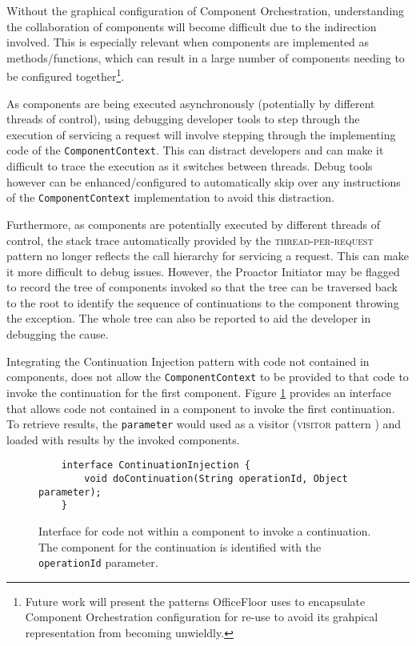 \documentclass[prodmode]{style/acmlarge}
\begin{document}
Without the graphical configuration of Component Orchestration, understanding
the collaboration of components will become difficult due to the indirection
involved.  This is especially relevant when components are implemented as
methods/functions, which can result in a large number of components needing to
be configured together\footnote{Future work will present the patterns
OfficeFloor \cite{officefloor} uses to encapsulate Component Orchestration
configuration for re-use to avoid its grahpical representation from becoming
unwieldly.}.

As components are being executed asynchronously (potentially by different
threads of control), using debugging developer tools to step through the
execution of servicing a request will involve stepping through the implementing
code of the \texttt{ComponentContext}.  This can distract developers and can
make it difficult to trace the execution as it switches between threads. 
Debug tools however can be enhanced/configured to automatically skip over any
instructions of the \texttt{ComponentContext} implementation to avoid this
distraction.

Furthermore, as components are potentially executed by different threads of
control, the stack trace automatically provided by the
\textsc{thread-per-request} pattern no longer reflects the call hierarchy for
servicing a request.  This can make it more difficult to debug issues.  However,
the Proactor Initiator may be flagged to record the tree of components invoked
so that the tree can be traversed back to the root to identify the sequence of
continuations to the component throwing the exception.  The whole tree can also
be reported to aid the developer in debugging the cause.

Integrating the Continuation Injection pattern with code not contained in
components, does not allow the \texttt{ComponentContext} to be provided to that
code to invoke the continuation for the first component.  Figure
\ref{fig:ContinuationInjectionInterface} provides an interface that allows code
not contained in a component to invoke the first continuation.  To retrieve
results, the \texttt{parameter} would used as a visitor (\textsc{visitor}
pattern \cite{gof}) and loaded with results by the invoked components.

\begin{figure}[tp]
\begin{verbatim}
    interface ContinuationInjection {
        void doContinuation(String operationId, Object parameter);
    }
\end{verbatim}
\caption{Interface for code not within a component to invoke a continuation.  The component for the continuation is identified with the \texttt{operationId} parameter.}
\label{fig:ContinuationInjectionInterface}
\end{figure}
\end{document}
